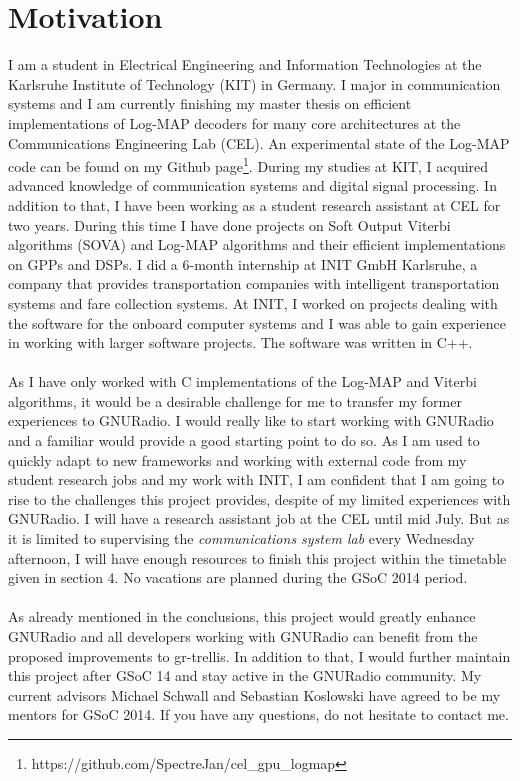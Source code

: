 \documentclass[11pt,		%
	    DIV12,		%
	    a4paper,		%
	    final,		%
	    halfparskip,	%
	    ]{scrartcl}		%
\begin{document}
\section{Motivation}
I am a student in Electrical Engineering and Information Technologies at the Karlsruhe Institute of Technology (KIT) in Germany. I major in communication systems and I am currently finishing my master thesis on efficient implementations of Log-MAP decoders for many core architectures at the Communications Engineering Lab (CEL). An experimental state of the Log-MAP code can be found on my Github page\footnote[1]{https://github.com/SpectreJan/cel\_gpu\_logmap}. During my studies at KIT, I acquired advanced knowledge of communication systems and digital signal processing. In addition to that, I have been working as a student research assistant at CEL for two years. During this time I have done projects on Soft Output Viterbi algorithms (SOVA) and Log-MAP algorithms and their efficient implementations on GPPs and DSPs. I did a 6-month internship at INIT GmbH Karlsruhe, a company that provides transportation companies with intelligent transportation systems and fare collection systems. At INIT, I worked on projects dealing with the software for the onboard computer systems and I was able to gain experience in working with larger software projects. The software was written in C++.\\ \\As I have only worked with C implementations of the Log-MAP and Viterbi algorithms, it would be a desirable challenge for me to transfer my former experiences to GNURadio. I would really like to start working with GNURadio and a familiar would provide a good starting point to do so. As I am used to quickly adapt to new frameworks and working with external code from my student research jobs and my work with INIT, I am confident that I am going to rise to the challenges this project provides, despite of my limited experiences with GNURadio. I will have a research assistant job at the CEL until mid July. But as it is limited to supervising the \textit{communications system lab} every Wednesday afternoon, I will have enough resources to finish this project within the timetable given in section 4. No vacations are planned during the GSoC 2014 period.\\ \\As already mentioned in the conclusions, this project would greatly enhance GNURadio and all developers working with GNURadio can benefit from the proposed improvements to gr-trellis. In addition to that, I would further maintain this project after GSoC 14 and stay active in the GNURadio community. My current advisors Michael Schwall and Sebastian Koslowski have agreed to be my mentors for GSoC 2014. If you have any questions, do not hesitate to contact me.\newpage                    
\appendix

%  
%  
%  
  
\end{document}
